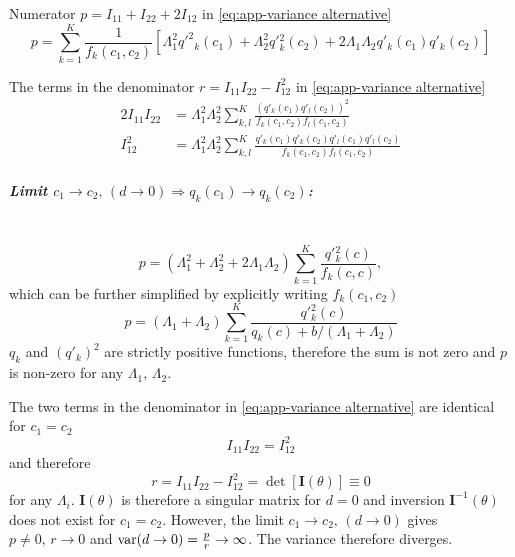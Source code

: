 Numerator $p=I_{11}+I_{22}+2I_{12}$ in \autoref{eq:app-variance alternative}
\begin{equation}
	p=\sum_{k=1}^K\frac{1}{f_k(c_1,c_2)}\left[\Lambda_1^2q'^2{}_k(c_1)+\Lambda_2^2q'{}_k^2(c_2)+2\Lambda_1\Lambda_2q'_k(c_1)q'_k(c_2)\right]
\end{equation}

The terms in the denominator $r=I_{11}I_{22}-I_{12}^2$ in \autoref{eq:app-variance alternative}
%
\begin{alignat*}{2}
	I_{11}I_{22} & =\Lambda_1^2\Lambda_2^2\sum_{k,l}^K\frac{\left(q'_k(c_1)q'_l(c_2)\right)^2}{f_k(c_1,c_2)f_l(c_1,c_2)}\\
	I_{12}^2 & =\Lambda_1^2\Lambda_2^2\sum_{k,l}^K\frac{q'_k(c_1)q'_k(c_2)q'_l(c_1)q'_l(c_2)}{f_k(c_1,c_2)f_l(c_1,c_2)}
\end{alignat*}

\subparagraph*{Limit $c_1\rightarrow c_2,\,(d\rightarrow0)\Rightarrow q_k(c_1)\rightarrow q_k(c_2)$:}\ \\
%
\begin{equation}
	p=(\Lambda_1^2+\Lambda_2^2+2\Lambda_1\Lambda_2)\sum_{k=1}^K\frac{q'{}_k^2(c)}{f_k(c,c)},
\end{equation}
%
which can be further simplified by explicitly writing $f_k(c_1,c_2)$
%
\begin{equation}
	p=(\Lambda_1+\Lambda_2)\sum_{k=1}^K\frac{q'{}_k^2(c)}{q_k(c)+b/(\Lambda_1+\Lambda_2)}
\end{equation}
%
$q_k$ and $(q'_k)^2$ are strictly positive functions, therefore the sum is not zero and $p$ is non-zero for any $\Lambda_1,\,\Lambda_2$. 

The two terms in the denominator in \autoref{eq:app-variance alternative} are identical for $c_1=c_2$
\begin{equation}
	I_{11}I_{22}=I_{12}^2
\end{equation}
%
and therefore 
%
\begin{equation*}
	r=I_{11}I_{22}-I_{12}^2=\det\left[\bm{I}(\theta)\right] \equiv 0
\end{equation*}
%
for any $\Lambda_i$. $\bm{I}(\theta)$ is therefore a singular matrix for $d=0$ and inversion $\bm{I}^{-1}(\theta)$ does not exist for $c_1=c_2$. However,  the limit $c_1\rightarrow c_2,\,(d\rightarrow0)$ gives $p\neq0,\, r\rightarrow0$ and $\mathrm{var}(d\rightarrow0)=\frac{p}{r}\rightarrow\infty$. The variance therefore diverges. 

